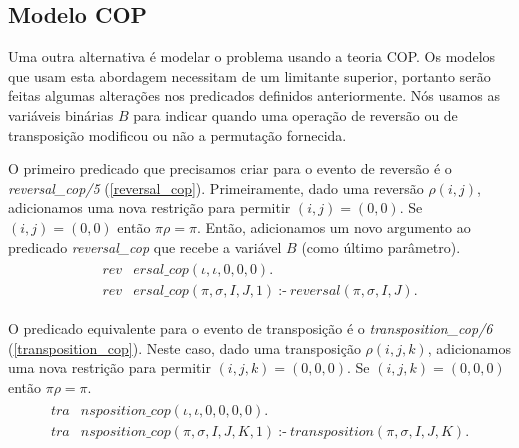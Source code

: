 \subsection{Modelo COP}
\label{subsec:modelcop}
Uma outra alternativa é modelar o problema usando a teoria COP. Os
modelos que usam esta abordagem necessitam de um limitante superior,
portanto serão feitas algumas alterações nos predicados definidos
anteriormente. Nós usamos as variáveis binárias $B$ para indicar
quando uma operação de reversão ou de transposição modificou ou não a
permutação fornecida.

O primeiro predicado que precisamos criar para o evento de reversão é
o \textit{reversal\_cop/5} (\ref{reversal_cop}). Primeiramente, dado
uma reversão $\rho(i, j)$, adicionamos uma nova restrição para
permitir $(i, j) = (0, 0)$. Se $(i, j) = (0, 0)$ então $\pi\rho
= \pi$. Então, adicionamos um novo argumento ao
predicado \textit{reversal\_cop} que recebe a variável $B$ (como
último parâmetro).
\begin{align}
  \label{reversal_cop}
  \begin{split}
  \textit{rev}&\textit{ersal\_cop}(\iota, \iota, 0, 0, 0). \\
  \textit{rev}&\textit{ersal\_cop}(\pi, \sigma, I, J, 1)~\text{:-}~ 
  \textit{reversal}(\pi, \sigma, I, J).
  \end{split}
\end{align}

O predicado equivalente para o evento de transposição é
o \textit{transposition\_cop/6} (\ref{transposition_cop}). Neste caso,
dado uma transposição $\rho(i, j, k)$, adicionamos uma nova restrição
para permitir $(i, j, k) = (0, 0, 0)$. Se $(i, j, k) = (0, 0, 0)$
então $\pi\rho = \pi$.
\begin{align}
  \label{transposition_cop}
  \begin{split}
  \textit{tra}&\textit{nsposition\_cop}(\iota, \iota, 0, 0, 0, 0). \\
  \textit{tra}&\textit{nsposition\_cop}(\pi, \sigma, I, J, K, 1)~\text{:-}~ 
  \textit{transposition}(\pi, \sigma, I, J, K). 
  \end{split}
\end{align}

